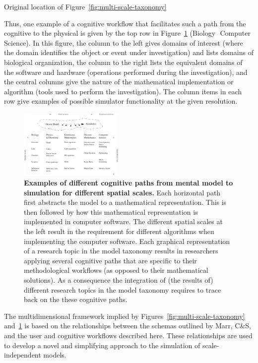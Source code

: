 \documentclass[11pt,3p,twocolumn]{JMN}
\begin{document}
Original location of Figure~\ref{fig:multi-scale-taxonomy}

Thus, one example of a cognitive workflow that facilitates such a path from the cognitive to the physical is given by the top row in Figure~\ref{fig:mental-model-simulation-path} (Biology \textrightarrow\,\,Computer Science).  In this figure, the column to the left gives domains of interest (where the domain identifies the object or event under investigation) and lists domains of biological organization, the column to the right lists the equivalent domains of the software and hardware (operations performed during the investigation), and the central columns give the nature of the mathematical implementation or algorithm (tools used to perform the investigation).  The column items in each row give examples of possible simulator functionality at the given resolution.

\begin{figure}[h!t]
  \begin{center}
    \includegraphics[width=0.45\textwidth]{figures/NS-abstraction-implementation.eps}
  \end{center}
  \caption{ \small{\bf Examples of different cognitive paths from mental model to simulation for different spatial scales.}  Each horizontal path first abstracts the model to a mathematical representation.  This is then followed by how this mathematical representation is implemented in computer software.  The different spatial scales at the left result in the requirement for different algorithms when implementing the computer software.  Each graphical representation of a research topic in the model taxonomy results in researchers applying several cognitive paths that are specific to their methodological workflows (as opposed to their mathematical solutions).  As a consequence the integration of (the results of) different research topics in the model taxonomy requires to trace back on the these cognitive paths.  }
  \label{fig:mental-model-simulation-path}
\end{figure}

The multidimensional framework implied by Figures~\ref{fig:multi-scale-taxonomy} and~\ref{fig:mental-model-simulation-path} is based on the relationships between the schemas outlined by Marr, C\&S, and the user and cognitive workflows described here. These relationships are used to develop a novel and simplifying approach to the simulation of scale-independent models.
\end{document}
